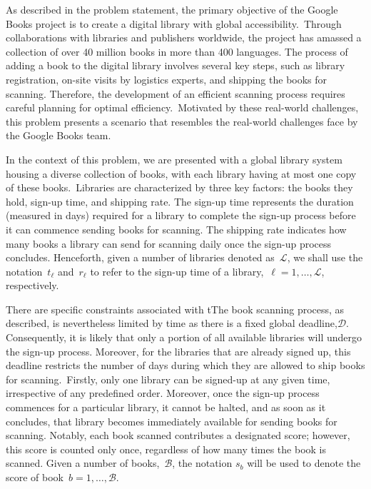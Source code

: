 As described in the problem statement, the primary objective of the Google Books
project is to create a digital library with global accessibility.~Through
collaborations with libraries and publishers worldwide, the project has amassed
a collection of over 40 million books in more than 400 languages. The process of
adding a book to the digital library involves several key steps, such as library
registration, on-site visits by logistics experts, and shipping the books for
scanning. Therefore, the development of an efficient scanning process requires
careful planning for optimal efficiency.~Motivated by these real-world
challenges, this problem presents a scenario that resembles the real-world
challenges face by the Google Books team.

In the context of this problem, we are presented with a global library system
housing a diverse collection of books, with each library having at most one copy
of these books.~Libraries are characterized by three key factors: the books they
hold, sign-up time, and shipping rate. The sign-up time represents the duration
(measured in days) required for a library to complete the sign-up process before
it can commence sending books for scanning. The shipping rate indicates how many
books a library can send for scanning daily once the sign-up process concludes.
Henceforth, given a number of libraries denoted as~$\mathcal{L}$, we shall
use the notation~$t_{\ell}$ and~$r_{\ell}$ to refer to the sign-up time of a
library,~$\ell = 1, \ldots, \mathcal{L}$, respectively.

There are specific constraints associated with tThe book scanning process, as
described, is nevertheless limited by time as there is a fixed global
deadline,$\mathcal{D}$. Consequently, it is likely that only a portion of all
available libraries will undergo the sign-up process.  Moreover, for the
libraries that are already signed up, this deadline restricts the number of days
during which they are allowed to ship books for scanning.~Firstly,
only one library can be signed-up at any given time, irrespective of any
predefined order. Moreover, once the sign-up process commences for a particular
library, it cannot be halted, and as soon as it concludes, that library becomes
immediately available for sending books for scanning. Notably, each book scanned
contributes a designated score; however, this score is counted only once,
regardless of how many times the book is scanned. Given a number of
books,~$\mathcal{B}$, the notation $s_{b}$ will be used to denote the score of
book~$b = 1, \ldots, \mathcal{B}$.

